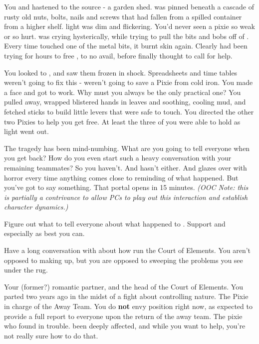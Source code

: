 \documentclass[char]{PP}
\begin{document}
You and \cSPM{} hastened to the source - a garden shed. \cFLost{} was pinned beneath a cascade of rusty old nuts, bolts, nails and screws that had fallen from a spilled container from a higher shelf. \cFLost{\Their} light was dim and flickering. You’d never seen a pixie so weak or so hurt. \cMChange{} was crying hysterically, while trying to pull the bits and bobs off of \cFLost{}. Every time \cMChange{} touched one of the metal bits, it burnt \cMChange{\their} skin again. Clearly \cMChange{\they} had been trying for hours to free \cFLost{}, to no avail, before \cMChange{\they} finally thought to call for help.

You looked to \cSPM{}, and saw them frozen in shock. Spreadsheets and time tables weren’t going to fix this - weren’t going to save a Pixie from cold iron. You made a face and got to work. Why must you always be the only practical one? You pulled \cMChange{} away, wrapped \cMChange{\their} blistered hands in leaves and soothing, cooling mud, and fetched sticks to build little levers that were safe to touch. You directed the other two Pixies to help you get \cFLost{} free. At least the three of you were able to hold \cFLost{\them} as \cFLost{\their} light went out.

The tragedy has been mind-numbing. What are you going to tell everyone when you get back? How do you even start such a heavy conversation with your remaining teammates? So you haven’t. And \cSPM{} hasn’t either. And \cMChange{} glazes over with horror every time anything comes close to reminding \cMChange{\them} of what happened. But you’ve got to say something. That portal opens in 15 minutes. \textit{(OOC Note: this is partially a contrivance to allow PCs to play out this interaction and establish character dynamics.)}


\begin{itemz}
	\item Figure out what to tell everyone about what happened to \cFLost{}. Support \cSPM{} and especially \cMChange{} as best you can.
	\item Have a long conversation with \cEHead{} about how \cEHead{\they} run\cEHead{\plural} the Court of Elements. You aren’t opposed to making up, but you are opposed to sweeping the problems you see under the rug.
\end{itemz}

\begin{itemz}[Notes]
	\item 
\end{itemz}

\begin{contacts}
	\contact{\cEHead{}} Your (former?) romantic partner, and the head of the Court of Elements. You parted two years ago in the midst of a fight about \cEHead{\their} controlling nature.
	\contact{\cSPM{}} The Pixie in charge of the Away Team. You do \textbf{not} envy \cSPM{\their} position right now, as \cSPM{\they} \cSPM{\are} expected to provide a full report to everyone upon the return of the away team.
	\contact{\cMChange{}} The pixie who found \cFLost{} in trouble. \cMChange{\They} \cMChange{\have} been deeply affected, and while you want to help, you’re not really sure how to do that.
\end{contacts}
\end{document}
